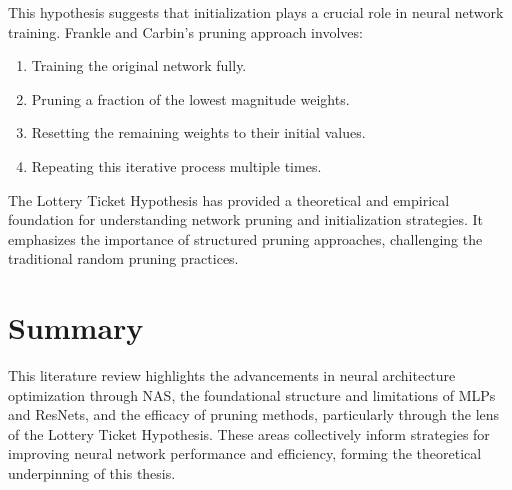 This hypothesis suggests that initialization plays a crucial role in neural network training. Frankle and Carbin’s pruning approach involves:
\begin{enumerate}
\item Training the original network fully.
\item Pruning a fraction of the lowest magnitude weights.
\item Resetting the remaining weights to their initial values.
\item Repeating this iterative process multiple times.
\end{enumerate}

The Lottery Ticket Hypothesis has provided a theoretical and empirical foundation for understanding network pruning and initialization strategies. It emphasizes the importance of structured pruning approaches, challenging the traditional random pruning practices.

\section{Summary}
This literature review highlights the advancements in neural architecture optimization through NAS, the foundational structure and limitations of MLPs and ResNets, and the efficacy of pruning methods, particularly through the lens of the Lottery Ticket Hypothesis. These areas collectively inform strategies for improving neural network performance and efficiency, forming the theoretical underpinning of this thesis.